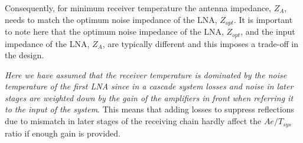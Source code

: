 \documentclass[11pt]{article}
\begin{document}
Consequently, for minimum receiver temperature the antenna impedance, $Z_A$, needs to match the optimum noise impedance of the LNA, $Z_{opt}$. It is important to note here that the optimum noise impedance of the LNA, $Z_{opt}$, and the input impedance of the LNA, $Z_A$, are typically different and this imposes a trade-off in the design.

{\em Here we have assumed that the receiver temperature is dominated by the noise temperature of the first LNA since in a cascade system losses and noise in later stages are weighted down by the gain of the amplifiers in front when referring it to the input of the system}. This means that adding losses to suppress reflections due to mismatch in later stages of the receiving chain hardly affect the $Ae/T_{sys}$ ratio if enough gain is provided.  

%
%
%


\end{document}
